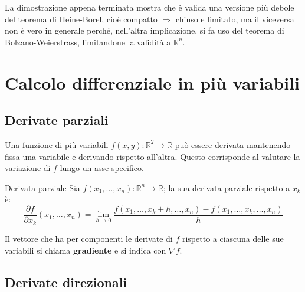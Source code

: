 \documentclass[11pt, a4paper]{scrartcl}
\theoremstyle{definition}
\numberwithin{esempio}{section}
\theoremstyle{definition}
\numberwithin{obs}{section}
\numberwithin{nota}{section}
\numberwithin{equation}{subsection}
\begin{document}
\noindent La dimostrazione appena terminata mostra che \`e valida una versione pi\`u debole del teorema di Heine-Borel, cio\`e compatto $\Rightarrow $ chiuso e limitato, ma il viceversa non \`e vero in generale perch\'e, nell'altra implicazione, si fa uso del teorema di Bolzano-Weierstrass, limitandone la validit\`a a $\mathbb{R}^n$.



















\newpage

\section{Calcolo differenziale in pi\`u variabili}
\subsection{Derivate parziali}

Una funzione di pi\`u variabili $f(x,y):\mathbb{R}^2 \to \mathbb{R}$ pu\`o essere derivata mantenendo fissa una variabile e derivando rispetto all'altra. Questo corrisponde al valutare la variazione di $f$ lungo un asse specifico.
\begin{definizione}
	{Derivata parziale}{}
	Sia $f(x_1,\ldots,x_n) :\mathbb{R}^n \to \mathbb{R}$; la sua derivata parziale rispetto a $x_k$ \`e:
	\begin{equation}
		\frac{\partial f}{\partial x_k}(x_1,\ldots,x_n) = \lim_{h \to 0} \frac{f(x_1,\ldots,x_k + h, \ldots, x_n)-f(x_1,\ldots,x_k,\ldots,x_n)}{h}
	\end{equation}
\end{definizione}
\noindent Il vettore che ha per componenti le derivate di $f$ rispetto a ciascuna delle sue variabili si chiama \textbf{gradiente} e si indica con $\nabla f$.

\subsection{Derivate direzionali}
\end{document}
